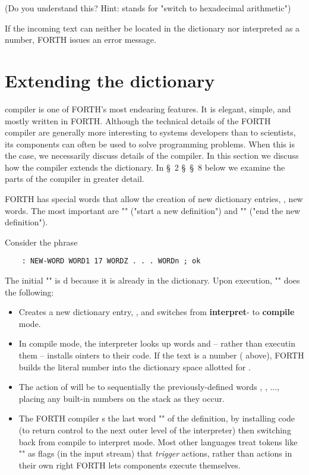 (Do you understand this? Hint:  stands for "switch to hexadecimal arithmetic")

If the incoming text can neither be located in the dictionary nor interpreted as a number, FORTH issues an error message.


\section{Extending the dictionary}

 compiler is one of FORTH's most endearing features. It is elegant, simple, and mostly written in FORTH. Although the technical details of the FORTH compiler are generally more interesting to systems developers than to scientists, its components can often be used to solve programming problems. When this is the case, we necessarily discuss details of the compiler. In this section we discuss how the compiler extends the dictionary. In \S\ 2 \S\ \S\ 8 below we examine the parts of the compiler in greater detail.

FORTH has special words that allow the creation of new dictionary entries, \ie, new words. The most important are "\bc{:}" ("start a new definition") and "\bc{;}" ("end the new definition").

Consider the phrase

\begin{lstlisting}
    : NEW-WORD WORD1 17 WORDZ . . . WORDn ; ok
\end{lstlisting}

The initial "\bc{:}" is d because it is already in the dictionary. Upon execution, "\bc{:}" does the following:

\begin{itemize}
    \item Creates a new dictionary entry, , and switches from \textbf{interpret}- to \textbf{compile} mode.
    \item In compile mode, the interpreter looks up words and -- rather than executin them -- installs ointers to their code. If the text is a number ( above), FORTH builds the literal number into the dictionary space allotted for .
    \item The action of  will be to  sequentially the previously-defined words , , ..., placing any built-in numbers on the stack as they occur.
    \item The FORTH compiler s the last word "\bc{;}" of the definition, by installing code (to return control to the next outer level of the interpreter) then switching back from compile to interpret mode. Most other languages treat tokens like "\bc{;}" as ﬂags (in the input stream) that \textit{trigger} actions, rather than actions in their own right FORTH lets components execute themselves.
\end{itemize}

